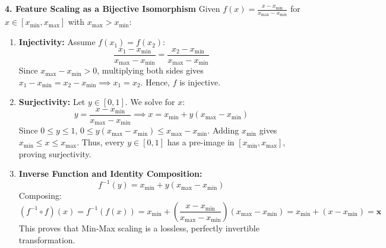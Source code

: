 \textbf{4. Feature Scaling as a Bijective Isomorphism}
Given $f(x) = \frac{x - x_{\min}}{x_{\max} - x_{\min}}$ for $x \in [x_{\min}, x_{\max}]$ with $x_{\max} > x_{\min}$:
\begin{enumerate}
    \item \textbf{Injectivity:} Assume $f(x_1) = f(x_2)$:
    $$\frac{x_1 - x_{\min}}{x_{\max} - x_{\min}} = \frac{x_2 - x_{\min}}{x_{\max} - x_{\min}}$$
    Since $x_{\max} - x_{\min} > 0$, multiplying both sides gives $x_1 - x_{\min} = x_2 - x_{\min} \implies x_1 = x_2$. Hence, $f$ is injective.
    \item \textbf{Surjectivity:} Let $y \in [0, 1]$. We solve for $x$:
    $$y = \frac{x - x_{\min}}{x_{\max} - x_{\min}} \implies x = x_{\min} + y(x_{\max} - x_{\min})$$
    Since $0 \le y \le 1$, $0 \le y(x_{\max} - x_{\min}) \le x_{\max} - x_{\min}$. Adding $x_{\min}$ gives $x_{\min} \le x \le x_{\max}$.
    Thus, every $y \in [0, 1]$ has a pre-image in $[x_{\min}, x_{\max}]$, proving surjectivity.
    \item \textbf{Inverse Function and Identity Composition:}
    $$f^{-1}(y) = x_{\min} + y(x_{\max} - x_{\min})$$
    Composing:
    $$(f^{-1} \circ f)(x) = f^{-1}(f(x)) = x_{\min} + \left( \frac{x - x_{\min}}{x_{\max} - x_{\min}} \right)(x_{\max} - x_{\min}) = x_{\min} + (x - x_{\min}) = \mathbf{x}$$
    This proves that Min-Max scaling is a lossless, perfectly invertible transformation.
\end{enumerate}

